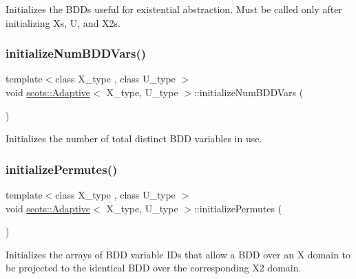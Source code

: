 Initializes the B\+D\+Ds useful for existential abstraction. Must be called only after initializing Xs, U, and X2s. \mbox{\label{classscots_1_1Adaptive_ab75f4bbed30ecc70747185f36fcab200}} 
\subsubsection{\texorpdfstring{initialize\+Num\+B\+D\+D\+Vars()}{initializeNumBDDVars()}}
{\footnotesize\ttfamily template$<$class X\+\_\+type , class U\+\_\+type $>$ \\
void \hyperlink{classscots_1_1Adaptive}{scots\+::\+Adaptive}$<$ X\+\_\+type, U\+\_\+type $>$\+::initialize\+Num\+B\+D\+D\+Vars (\begin{DoxyParamCaption}{ }\end{DoxyParamCaption})\hspace{0.3cm}{\ttfamily [inline]}}

Initializes the number of total distinct B\+DD variables in use. \mbox{\label{classscots_1_1Adaptive_a7351461977b9be0f07ec2974531af677}} 
\subsubsection{\texorpdfstring{initialize\+Permutes()}{initializePermutes()}}
{\footnotesize\ttfamily template$<$class X\+\_\+type , class U\+\_\+type $>$ \\
void \hyperlink{classscots_1_1Adaptive}{scots\+::\+Adaptive}$<$ X\+\_\+type, U\+\_\+type $>$\+::initialize\+Permutes (\begin{DoxyParamCaption}{ }\end{DoxyParamCaption})\hspace{0.3cm}{\ttfamily [inline]}}

Initializes the arrays of B\+DD variable I\+Ds that allow a B\+DD over an X domain to be projected to the identical B\+DD over the corresponding X2 domain. \mbox{\label{classscots_1_1Adaptive_a63afb68f37f6140095c2460d07fc19cb}} 
